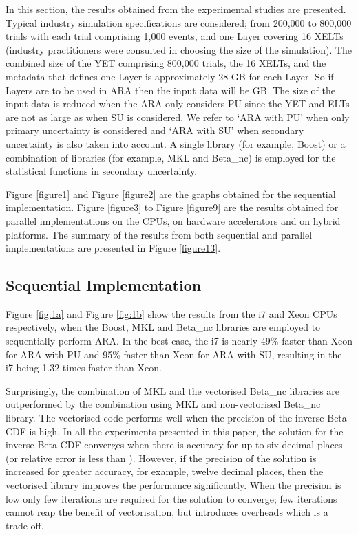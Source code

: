 
In this section, the results obtained from the experimental studies are presented. Typical industry simulation specifications are considered; from 200,000 to 800,000 trials with each trial comprising 1,000 events, and one Layer covering 16 XELTs (industry practitioners were consulted in choosing the size of the simulation). The combined size of the YET comprising 800,000 trials, the 16 XELTs, and the metadata that defines one Layer is approximately 28 GB for each Layer. So if  Layers are to be used in ARA then the input data will be  GB. The size of the input data is reduced when the ARA only considers PU since the YET and ELTs are not as large as when SU is considered. We refer to `ARA with PU' when only primary uncertainty is considered and `ARA with SU' when secondary uncertainty is also taken into account. A single library (for example, Boost) or a combination of libraries (for example, MKL and Beta\_nc) is employed for the statistical functions in secondary uncertainty. 

Figure \ref{figure1} and Figure \ref{figure2} are the graphs obtained for the sequential implementation. Figure \ref{figure3} to Figure \ref{figure9} are the results obtained for parallel implementations on the CPUs, on hardware accelerators and on hybrid platforms. The summary of the results from both sequential and parallel implementations are presented in Figure \ref{figure13}.

\subsection{Sequential Implementation}

Figure \ref{fig:1a} and Figure \ref{fig:1b} show the results from the i7 and Xeon CPUs respectively, when the Boost, MKL and Beta\_nc libraries are employed to sequentially perform ARA. 
In the best case, the i7 is nearly 49\% faster than Xeon for ARA with PU and 95\% faster than Xeon for ARA with SU, resulting in the i7 being 1.32 times faster than Xeon. 

Surprisingly, the combination of MKL and the vectorised Beta\_nc libraries are outperformed by the combination using MKL and non-vectorised Beta\_nc library. 
The vectorised code performs well when the precision of the inverse Beta CDF is high. 
In all the experiments presented in this paper, the solution for the inverse Beta CDF converges when there is accuracy for up to six decimal places (or relative error is less than ). 
However, if the precision of the solution is increased for greater accuracy, for example, twelve decimal places, then the vectorised library improves the performance significantly. 
When the precision is low only few iterations are required for the solution to converge; few iterations cannot reap the benefit of vectorisation, but introduces overheads which is a trade-off. 

